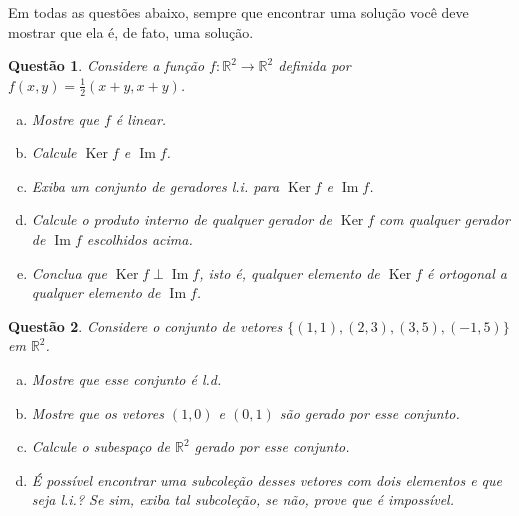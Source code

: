 \documentclass[a4paper,12pt]{article}
\author{``2º Testinho'' - GAAL}
\date{02 de Maio de 2019}
\title{}
\def\R{\mathbb R}
\DeclareMathOperator{\Ker}{Ker}
\DeclareMathOperator{\im}{Im}
\newtheorem{qst}{Questão}
\begin{document}
\maketitle

Em todas as questões abaixo, sempre que encontrar uma solução você deve mostrar que ela é, de fato, uma solução.

\begin{qst}
Considere a função $f:\R^2\to \R^2$ definida por $f(x,y)=\frac{1}{2}(x+y,x+y)$.
\begin{enumerate}[a)]
	\item Mostre que $f$ é linear.
	\item Calcule $\Ker f$ e $\im f$.
	\item Exiba um conjunto de geradores l.i. para $\Ker f$ e $\im f$.
	\item Calcule o produto interno de qualquer gerador de $\Ker f$ com qualquer gerador de $\im f$ escolhidos acima.
	\item Conclua que $\Ker f\perp\im f$, isto é, qualquer elemento de $\Ker f$ é ortogonal a qualquer elemento de $\im f$.
\end{enumerate}
\end{qst}

\begin{qst}
Considere o conjunto de vetores $\{(1,1), (2,3), (3,5), (-1, 5)\}$ em $\R^2$.
\begin{enumerate}[a)]
	\item Mostre que esse conjunto é l.d.
	\item Mostre que os vetores $(1,0)$ e $(0,1)$ são gerado por esse conjunto.
	\item Calcule o subespaço de $\R^2$ gerado por esse conjunto.
	\item É possível encontrar uma subcoleção desses vetores com dois elementos e que seja l.i.? Se sim, exiba tal subcoleção, se não, prove que é impossível.
\end{enumerate}
\end{qst}
\end{document}
